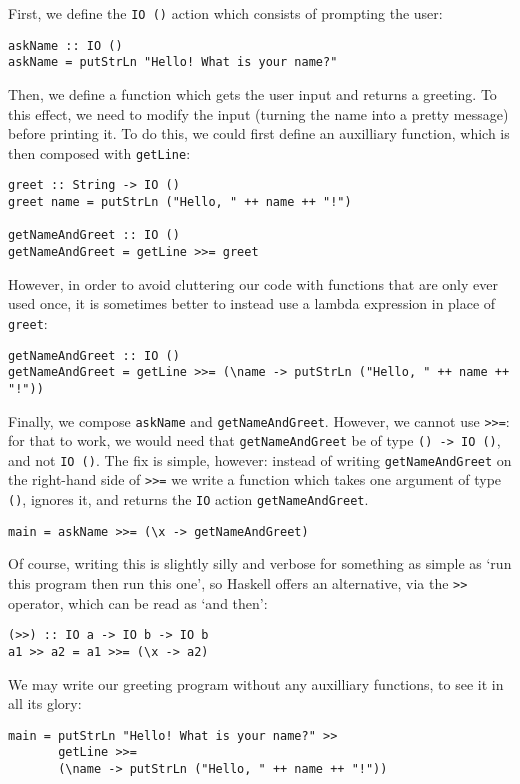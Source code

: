 \documentclass[11pt]{article}
\theoremstyle{nonumberplain}
\newcommand*\lsin{\lstinline}
\begin{document}
First, we define the \lsin|IO ()| action which consists of prompting the user:
\begin{lstlisting}
askName :: IO ()
askName = putStrLn "Hello! What is your name?"
\end{lstlisting}

Then, we define a function which gets the user input and returns a greeting. To this effect, we need to modify the input (turning the name into a pretty message) before printing it. To do this, we could first define an auxilliary function, which is then composed with \lsin|getLine|:
\begin{lstlisting}
greet :: String -> IO ()
greet name = putStrLn ("Hello, " ++ name ++ "!")

getNameAndGreet :: IO ()
getNameAndGreet = getLine >>= greet
\end{lstlisting}

However, in order to avoid cluttering our code with functions that are only ever used once, it is sometimes better to instead use a lambda expression in place of \lsin|greet|:
\begin{lstlisting}
getNameAndGreet :: IO ()
getNameAndGreet = getLine >>= (\name -> putStrLn ("Hello, " ++ name ++ "!"))
\end{lstlisting}

Finally, we compose \lsin|askName| and \lsin|getNameAndGreet|. However, we cannot use \lsin|>>=|: for that to work, we would need that \lsin|getNameAndGreet| be of type \lsin|() -> IO ()|, and not \lsin|IO ()|. The fix is simple, however: instead of writing \lsin|getNameAndGreet| on the right-hand side of \lsin|>>=| we write a function which takes one argument of type \lsin|()|, ignores it, and returns the \lsin|IO| action \lsin|getNameAndGreet|.
\begin{lstlisting}
main = askName >>= (\x -> getNameAndGreet)
\end{lstlisting}

Of course, writing this is slightly silly and verbose for something as simple as `run this program then run this one', so Haskell offers an alternative, via the \lsin|>>| operator, which can be read as `and then':
\begin{lstlisting}
(>>) :: IO a -> IO b -> IO b
a1 >> a2 = a1 >>= (\x -> a2)
\end{lstlisting}

We may write our greeting program without any auxilliary functions, to see it in all its glory:
\begin{lstlisting}
main = putStrLn "Hello! What is your name?" >>
       getLine >>=
       (\name -> putStrLn ("Hello, " ++ name ++ "!"))
\end{lstlisting}
\end{document}
